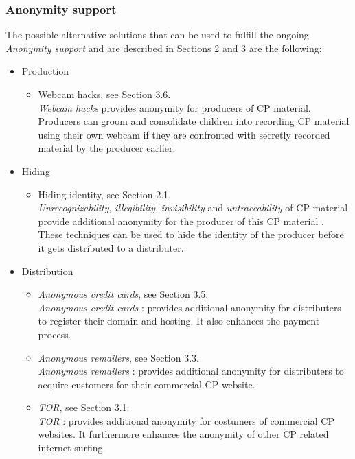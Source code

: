 \documentclass{sig-alternate-br}
\begin{document}
\subsubsection{Anonymity support}
The possible alternative solutions that can be used to fulfill the ongoing \textit{Anonymity support} and are described in Sections 2 and 3 are the following:
\begin{itemize}
	\item Production
		\begin{itemize}
			\item Webcam hacks, see Section 3.6.\\
				\textit{Webcam hacks} \cite{mishna2009ongoing,salomon2010examples} provides anonymity for producers of CP material. Producers can groom and consolidate children into recording CP material using their own webcam if they are confronted with secretly recorded material by the producer earlier.
		\end{itemize}
	\item Hiding
		\begin{itemize}
			\item Hiding identity, see Section 2.1.\\
				\textit{Unrecognizability}, \textit{illegibility}, \textit{invisibility} and \textit{untraceability} of CP material provide additional anonymity for the producer of this CP material \cite{en2011phishing}. These techniques can be used to hide the identity of the producer before it gets distributed to a distributer.
		\end{itemize}
	\item Distribution
		\begin{itemize}
			\item \textit{Anonymous credit cards}, see Section 3.5.\\
				\textit{Anonymous credit cards} \cite{wall2007cybercrime}: provides additional anonymity for distributers to register their domain and hosting. It also enhances the payment process.
			\item \textit{Anonymous remailers}, see Section 3.3.\\
				\textit{Anonymous remailers} \cite{wall2007cybercrime}: provides additional anonymity for distributers to acquire customers for their commercial CP website.
			\item \textit{TOR}, see Section 3.1.\\
				\textit{TOR} \cite{dingledine2004tor}: provides additional anonymity for costumers of commercial CP websites. It furthermore enhances the anonymity of other CP related internet surfing.

\end{itemize}
\end{itemize}
\end{document}
